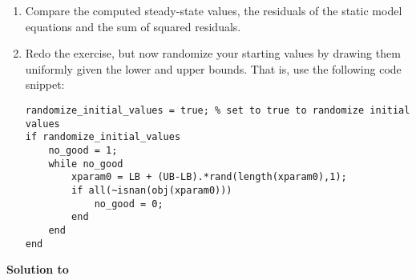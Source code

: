 \begin{enumerate}
\item
Compare the computed steady-state values, the residuals of the static model equations and the sum of squared residuals.

\item
Redo the exercise, but now randomize your starting values
  by drawing them uniformly given the lower and upper bounds.
That is, use the following code snippet:
\begin{lstlisting}[style=Matlab-editor,basicstyle=\mlttfamily\scriptsize]
randomize_initial_values = true; % set to true to randomize initial values
if randomize_initial_values
    no_good = 1;
    while no_good
        xparam0 = LB + (UB-LB).*rand(length(xparam0),1);
        if all(~isnan(obj(xparam0)))
            no_good = 0;
        end
    end
end
\end{lstlisting}
\end{enumerate}

\newpage



\begin{solution}\textbf{Solution to }
\ifDisplaySolutions%

\fi
\newpage
\end{solution}